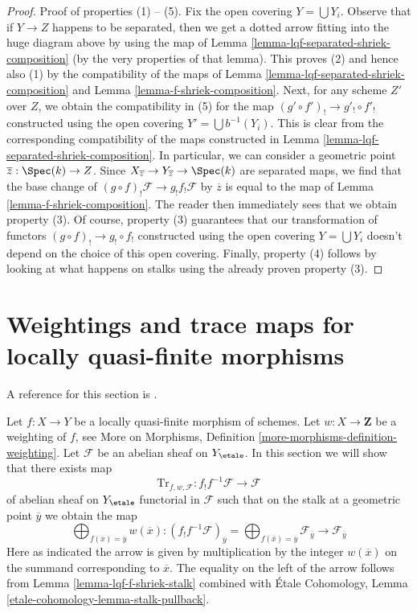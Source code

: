 \begin{proof}
\medskip\noindent
Proof of properties (1) -- (5). Fix the open covering $Y = \bigcup Y_i$.
Observe that if $Y \to Z$ happens to be separated, then we get a dotted
arrow fitting into the huge diagram above by using the map of
Lemma \ref{lemma-lqf-separated-shriek-composition}
(by the very properties of that lemma).
This proves (2) and hence also (1) by the compatibility of the
maps of Lemma \ref{lemma-lqf-separated-shriek-composition}
and Lemma \ref{lemma-f-shriek-composition}.
Next, for any scheme $Z'$ over $Z$, we obtain the compatibility in (5)
for the map $(g' \circ f')_! \to g'_! \circ f'_!$
constructed using the open covering $Y' = \bigcup b^{-1}(Y_i)$.
This is clear from the corresponding compatibility of the maps
constructed in Lemma \ref{lemma-lqf-separated-shriek-composition}.
In particular, we can consider a geometric point
$\overline{z} : \Spec(k) \to Z$. Since
$X_{\overline{z}} \to Y_{\overline{z}} \to \Spec(k)$
are separated maps, we find that the base change of
$(g \circ f)_!\mathcal{F} \to g_! f_! \mathcal{F}$
by $\overline{z}$ is equal to the map of
Lemma \ref{lemma-f-shriek-composition}.
The reader then immediately sees that we obtain property (3).
Of course, property (3) guarantees that our transformation of functors
$(g \circ f)_! \to g_! \circ f_!$ constructed using the open covering
$Y = \bigcup Y_i$ doesn't depend on the choice of this open covering.
Finally, property (4) follows by looking at what happens on stalks
using the already proven property (3).
\end{proof}








\section{Weightings and trace maps for locally quasi-finite morphisms}
\label{section-weightings}

\noindent
A reference for this section is
\cite[Exposee XVII, Proposition 6.2.5]{SGA4}.

\medskip\noindent
Let $f : X \to Y$ be a locally quasi-finite morphism of schemes.
Let $w : X \to \mathbf{Z}$ be a weighting of $f$, see
More on Morphisms, Definition \ref{more-morphisms-definition-weighting}.
Let $\mathcal{F}$ be an abelian sheaf on $Y_\etale$.
In this section we will show that there exists map
$$
\text{Tr}_{f, w, \mathcal{F}} :
f_!f^{-1}\mathcal{F}
\longrightarrow
\mathcal{F}
$$
of abelian sheaf on $Y_\etale$ functorial in $\mathcal{F}$ such that on
the stalk at a geometric point $\overline{y}$ we obtain the map
$$
\bigoplus\nolimits_{f(\overline{x}) = \overline{y}} w(\overline{x}) :
(f_!f^{-1}\mathcal{F})_{\overline{y}} =
\bigoplus\nolimits_{f(\overline{x}) = \overline{y}}
\mathcal{F}_{\overline{y}}
\longrightarrow
\mathcal{F}_{\overline{y}}
$$
Here as indicated the arrow is given by multiplication by the integer
$w(\overline{x})$ on the summand corresponding to $\overline{x}$.
The equality on the left of the arrow follows from
Lemma \ref{lemma-lqf-f-shriek-stalk} combined with
\'Etale Cohomology, Lemma \ref{etale-cohomology-lemma-stalk-pullback}.

